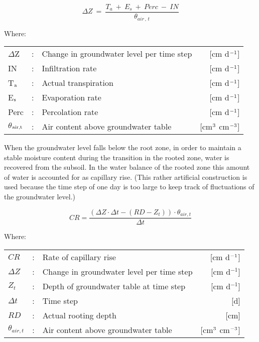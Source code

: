 \begin{equation}
\label{eq:6.51}
\Delta Z ~=~{\frac{T _{a} ~+~ E _{s} ~+~ Perc ~-~ IN }{\theta _{air\, ,\, t} }}
\end{equation}

Where:\\[5pt]
\begin{tabularx}{\textwidth}{llXr}
$\Delta$Z &:& Change in groundwater level per time step  & [cm d$^{{\rm -1}}$]\\
IN &:& Infiltration rate  & [cm d$^{{\rm -1}}$]\\
T$_{{\rm a}}$ &:& Actual transpiration  & [cm d$^{{\rm -1}}$]\\
E$_{{\rm s}}$ &:& Evaporation rate  & [cm d$^{{\rm -1}}$]\\
Perc &:& Percolation rate  & [cm d$^{{\rm -1}}$]\\
$\theta$$_{{\rm air,t}}$ &:& Air content above groundwater table  & [cm$^{{\rm 3}}$ cm$^{{\rm -3}}$]
\end{tabularx}

When the groundwater level falls below the root zone, in order to maintain a stable
moisture content during the transition in the rooted zone, water is recovered from the
subsoil. In the water balance of the rooted zone this amount of water is accounted for as
capillary rise. (This rather artificial construction is used because the time step of one day
is too large to keep track of fluctuations of the groundwater level.)

\begin{equation}
\label{eq:6.52}
CR = {\frac{ (\Delta Z \cdot \Delta t - (RD - Z_{t})) \cdot \theta_{air, t} }{\Delta t}}
\end{equation}

Where:\\[5pt]
\begin{tabularx}{\textwidth}{llXr}
$CR$ &:& Rate of capillary rise  & [cm d$^{{\rm -1}}$]\\
$\Delta Z$ &:& Change in groundwater level per time step  & [cm d$^{-1}$]\\ 
$Z_{t}$ &:& Depth of groundwater table at time step  & [cm d$^{-1}$]\\
$\Delta t$ &:& Time step  & [d]\\
$RD$ &:& Actual rooting depth  & [cm]\\
$\theta_{air,t}$ &:& Air content above groundwater table  & [cm$^{{\rm 3}}$ cm$^{{\rm -3}}$]\\
\end{tabularx}


